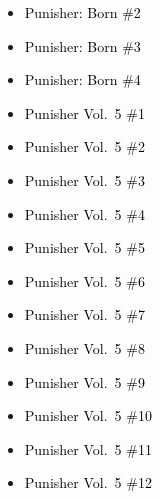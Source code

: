 \documentclass[12pt]{article}
\newcommand{\checkbox}{\raisebox{0.0ex}{\fbox{\rule{0ex}{1.5ex} \rule{1.5ex}{0ex}}}}
\begin{document}
\vspace{0.3cm}
\noindent
\begin{tcolorbox}[
  colback=white!95!gray,
  colframe=black,
  width=\textwidth,
  arc=4mm,
  auto outer arc,
  boxrule=0.8pt,
  left=8pt,right=8pt,top=8pt,bottom=8pt
]
\begin{itemize}[left=0pt,label={\checkbox}]
    \item \textcolor{black}{Punisher: Born \#2}
    \item \textcolor{black}{Punisher: Born \#3}
    \item \textcolor{black}{Punisher: Born \#4}
    \item \textcolor{black}{Punisher Vol.\ 5 \#1}
    \item \textcolor{black}{Punisher Vol.\ 5 \#2}
    \item \textcolor{black}{Punisher Vol.\ 5 \#3}
    \item \textcolor{black}{Punisher Vol.\ 5 \#4}
    \item \textcolor{black}{Punisher Vol.\ 5 \#5}
    \item \textcolor{black}{Punisher Vol.\ 5 \#6}
    \item \textcolor{black}{Punisher Vol.\ 5 \#7}
    \item \textcolor{black}{Punisher Vol.\ 5 \#8}
    \item \textcolor{black}{Punisher Vol.\ 5 \#9}
    \item \textcolor{black}{Punisher Vol.\ 5 \#10}
    \item \textcolor{black}{Punisher Vol.\ 5 \#11}
    \item \textcolor{black}{Punisher Vol.\ 5 \#12}
\end{itemize}
\end{tcolorbox}

\newpage
{}
\end{document}
